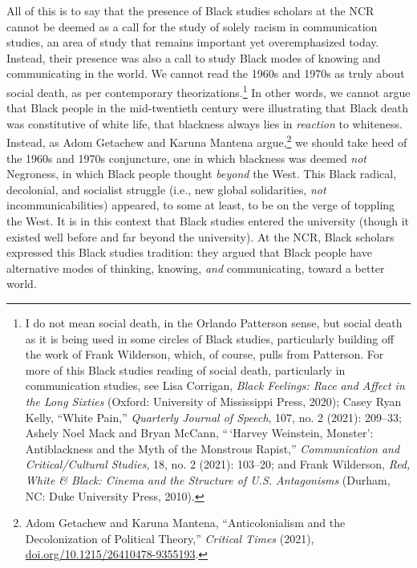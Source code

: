 \documentclass{tufte-handout}
\begin{document}
All of this is to say that the presence of Black studies scholars at the
NCR cannot be deemed as a call for the study of solely racism in
communication studies, an area of study that remains important yet
overemphasized today. Instead, their presence was also a call to study
Black modes of knowing and communicating in the world. We cannot read
the 1960s\setcounter{footnote}{17} and 1970s as truly about social death, as per contemporary
theorizations.\footnote{I do not mean social death, in the Orlando Patterson sense, but social
  death as it is being used in some circles of Black studies,
  particularly building off the work of Frank Wilderson, which, of
  course, pulls from Patterson. For more of this Black studies reading
  of social death, particularly in communication studies, see Lisa
  Corrigan, \emph{Black Feelings: Race and Affect in the Long Sixties}
  (Oxford: University of Mississippi Press, 2020); Casey Ryan Kelly,
  ``White Pain,'' \emph{Quarterly Journal of Speech}, 107, no. 2 (2021):
  209--33; Ashely Noel Mack and Bryan McCann, ``\,`Harvey Weinstein,
  Monster': Antiblackness and the Myth of the Monstrous Rapist,''
  \emph{Communication and Critical/Cultural Studies}, 18, no. 2 (2021):
  103--20; and Frank Wilderson, \emph{Red, White \& Black: Cinema and
  the Structure of U.S. Antagonisms} (Durham, NC: Duke University Press,
  2010).
} In other words, we
cannot argue that Black people in the mid-twentieth century were
illustrating that Black death was constitutive of white life, that
blackness always lies in \emph{reaction} to whiteness. Instead, as Adom
Getachew and Karuna Mantena
argue,\footnote{Adom Getachew and Karuna Mantena, ``Anticolonialism and the
  Decolonization of Political Theory,'' \emph{Critical Times} (2021),
  \href{http://doi.org/10.1215/26410478-9355193}{doi.org/10.1215/26410478-9355193}.
} we should take heed of the
1960s and 1970s conjuncture, one in which blackness was deemed
\emph{not} Negroness, in which Black people thought \emph{beyond} the
West. This Black radical, decolonial, and socialist struggle (i.e., new
global solidarities, \emph{not} incommunicabilities) appeared, to some
at least, to be on the verge of toppling the West. It is in this context
that Black studies entered the university (though it existed well before
and far beyond the university). At the NCR, Black scholars expressed
this Black studies tradition: they argued that Black people have
alternative modes of thinking, knowing, \emph{and} communicating, toward
a better world.
\end{document}
